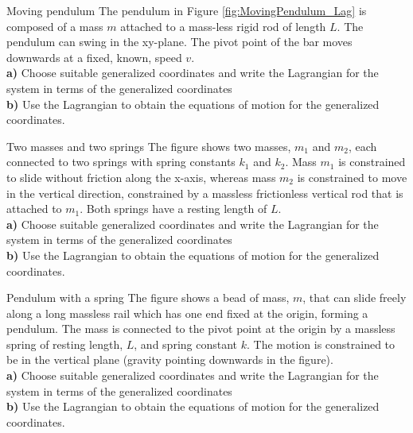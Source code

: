 \begin{problem}{Moving pendulum}
The pendulum in Figure \ref{fig:MovingPendulum_Lag} is composed of a mass $m$ attached to a mass-less rigid rod of length $L$. The pendulum can swing in the xy-plane. The pivot point of the bar moves downwards at a fixed, known, speed $v$.
\\
\textbf{a)} Choose suitable generalized coordinates and write the Lagrangian for the system in terms of the generalized coordinates\\
\textbf{b)} Use the Lagrangian to obtain the equations of motion for the generalized coordinates.
\label{prob_Lagrange_3}
\end{problem}


\begin{problem}{Two masses and two springs}
\label{prob_Lagrange_4}
The figure shows two masses, $m_1$ and $m_2$, each connected to two springs with spring constants $k_1$ and $k_2$. Mass $m_1$ is constrained to slide without friction along the x-axis, whereas mass $m_2$ is constrained to move in the vertical direction, constrained by a massless frictionless vertical rod that is attached to $m_1$. Both springs have a resting length of $L$.
\\
\textbf{a)} Choose suitable generalized coordinates and write the Lagrangian for the system in terms of the generalized coordinates\\
\textbf{b)} Use the Lagrangian to obtain the equations of motion for the generalized coordinates.
\end{problem}

\begin{problem}{Pendulum with a spring}
\label{prob_Lagrange_5}
The figure shows a bead of mass, $m$, that can slide freely along a long massless rail which has one end fixed at the origin, forming a pendulum. The mass is connected to the pivot point at the origin by a massless spring of resting length, $L$, and spring constant $k$. The motion is constrained to be in the vertical plane (gravity pointing downwards in the figure).
\\
\textbf{a)} Choose suitable generalized coordinates and write the Lagrangian for the system in terms of the generalized coordinates\\
\textbf{b)} Use the Lagrangian to obtain the equations of motion for the generalized coordinates.
\end{problem}


